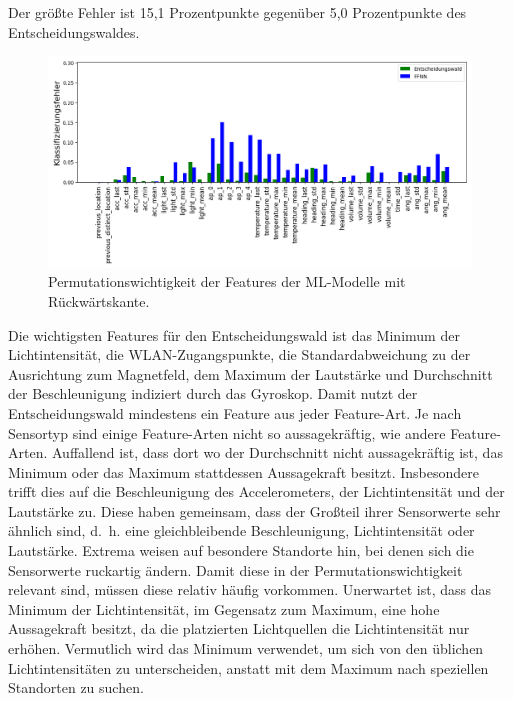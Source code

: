 Der größte Fehler ist 15,1 Prozentpunkte gegenüber 5,0 Prozentpunkte des Entscheidungswaldes.
\begin{figure}[h!]
    \centering
    \includegraphics[width=\linewidth]{images/fi_consolidated.png}
    \caption{Permutationswichtigkeit der Features der ML-Modelle mit Rückwärtskante.}
    \label{fig:fi_consolidated}
\end{figure}
\newline
\newline
Die wichtigsten Features für den Entscheidungswald ist das Minimum der Lichtintensität, die WLAN-Zugangspunkte, die Standardabweichung zu der Ausrichtung zum Magnetfeld,
dem Maximum der Lautstärke und Durchschnitt der Beschleunigung indiziert durch das Gyroskop.
Damit nutzt der Entscheidungswald mindestens ein Feature aus jeder Feature-Art.
Je nach Sensortyp sind einige Feature-Arten nicht so aussagekräftig, wie andere Feature-Arten.
\newline
\newline
Auffallend ist, dass dort wo der Durchschnitt nicht aussagekräftig ist, das Minimum oder das Maximum stattdessen Aussagekraft besitzt.
Insbesondere trifft dies auf die Beschleunigung des Accelerometers, der Lichtintensität und der Lautstärke zu.
Diese haben gemeinsam, dass der Großteil ihrer Sensorwerte sehr ähnlich sind,
d.~h. eine gleichbleibende Beschleunigung, Lichtintensität oder Lautstärke.
Extrema weisen auf besondere Standorte hin, bei denen sich die Sensorwerte ruckartig ändern.
Damit diese in der Permutationswichtigkeit relevant sind, müssen diese relativ häufig vorkommen.
Unerwartet ist, dass das Minimum der Lichtintensität, im Gegensatz zum Maximum, eine hohe Aussagekraft besitzt, da die platzierten Lichtquellen die Lichtintensität nur erhöhen.
Vermutlich wird das Minimum verwendet, um sich von den üblichen Lichtintensitäten zu unterscheiden, anstatt mit dem Maximum nach speziellen Standorten zu suchen.
